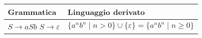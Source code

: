 \documentclass{standalone}
\begin{document}
\begin{tabularx}{\textwidth}{XX}
		Grammatica & Linguaggio derivato \\
    \midrule
        \(S \to aSb\) \newline
        \(S \to \varepsilon\)
        &
        \(\{a^nb^n \mid n>0\} \cup \{\varepsilon\} = \{a^nb^n \mid n \ge 0\}\)
\end{tabularx}
\end{document}
